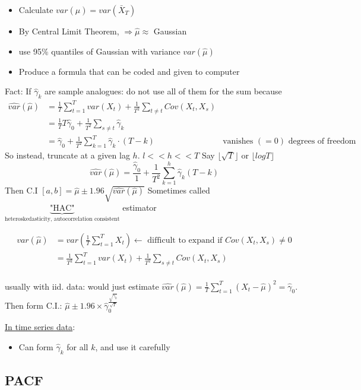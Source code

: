 \begin{itemize}
    \item Calculate $var(\hat{\mu})=var(\bar{X}_T) $
    \item By Central Limit Theorem, $\Rightarrow \hat{\mu} \approx$ Gaussian
    \item use 95\% quantiles of Gaussian with variance $var(\hat{\mu})$
    \item Produce a formula that can be coded and given to computer
\end{itemize}
Fact: If $\hat{\gamma}_k$ are sample analogues: do not use all of them for the sum because \begin{align*}
    \hat{var}(\hat{\mu}) &= \frac{1}{T}\sum_{t=1}^T var(X_t) + \frac{1}{T^2} \sum_{t\neq t} Cov(X_t, X_s) \\
    &= \frac{1}{T} T \hat{\gamma}_0 + \frac{1}{T^2} \sum_{s\neq t} \hat{\gamma}_k\\
    &= \hat{\gamma}_0 + \frac{1}{T^2} \sum_{k=1}^T \hat{\gamma}_k \cdot (T-k)
    &\text{vanishes $(=0)$ degrees of freedom problem}
\end{align*}
So instead, truncate at a given lag $h$. $l<<h<<T$ \quad Say \( \lfloor \sqrt{T} \rfloor \) or \( \lfloor log T \rfloor \)
\[
\hat{var}(\hat{\mu})=\frac{\hat{\gamma}_0}{1} + \frac{1}{T^2}\sum_{k=1}^h \hat{\gamma}_k (T-k)
\]
Then C.I $[a,b]=\hat{\mu} \pm 1.96 \sqrt{\hat{var}(\hat{\mu})} $
Sometimes called $\underbrace{\text{"HAC"}}_\text{heteroskedasticity, autocorrelation consistent}$ estimator

\begin{align*}
    var(\hat{\mu})&=var(\frac{1}{T}\sum_{t=1}^T X_t) \leftarrow \text{ difficult to expand if $Cov(X_t, X_s)\neq 0$}\\
    &=\frac{1}{T^2} \sum_{t=1}^T var(X_t) + \frac{1}{T^2} \sum_{s\neq t} Cov(X_t,X_s)\\
\end{align*}

usually with iid. data: would just estimate $\hat{var}(\hat{\mu})=\frac{1}{T}\sum_{t=1}^T(X_t-\hat{\mu})^2=\hat{\gamma}_0 $. Then form C.I.: $\hat{\mu}\pm 1.96 \times \hat{\gamma}_0^\frac{\sqrt{\hat{\gamma}_0}}{\sqrt{T}} $

\underline{In time series data}:
\begin{itemize}
    \item Can form $\hat{\gamma}_k$ for all $k$, and use it carefully
\end{itemize}


\subsection{PACF}

